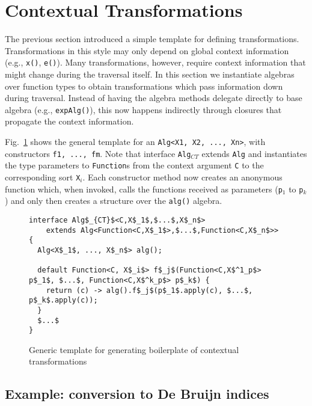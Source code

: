 \section{Contextual Transformations}\label{sec:contexttrans}

The previous section introduced a simple template for defining
transformations. Transformations in this style may only depend on
global context information (e.g., \lstinline{x()}, \lstinline{e()}).
Many transformations, however, require context information that might
change during the traversal itself. In this section we instantiate
algebras over function types to obtain transformations which pass
information down during traversal. Instead of having the algebra
methods delegate directly to base algebra (e.g.,
\lstinline{expAlg()}), this now happens indirectly through closures
that propagate the context information.

Fig.~\ref{ctxTrafoTemplate} shows the general template for an \lstinline{Alg<X1, X2, ..., Xn>}, with constructors \lstinline{f1, ..., fm}.
Note that interface \lstinline{Alg}$_{CT}$ extends \lstinline{Alg} and instantiates the type parameters to \lstinline{Function}s from the context argument \lstinline{C} to the corresponding sort \lstinline{X}$_i$.
Each constructor method now creates an anonymous function which, when invoked, calls the functions received as parameters (\lstinline{p}$_1$ to \lstinline{p}$_k$) and only then creates a structure over the \lstinline{alg()} algebra.

\begin{figure}[t]
\nocaptionrule
\begin{lstlisting}[mathescape=true]
interface Alg$_{CT}$<C,X$_1$,$...$,X$_n$>
    extends Alg<Function<C,X$_1$>,$...$,Function<C,X$_n$>> {
  Alg<X$_1$, ..., X$_n$> alg();

  default Function<C, X$_i$> f$_j$(Function<C,X$^1_p$> p$_1$, $...$, Function<C,X$^k_p$> p$_k$) {
    return (c) -> alg().f$_j$(p$_1$.apply(c), $...$, p$_k$.apply(c));
  }
  $...$
}
\end{lstlisting}
\caption{Generic template for generating boilerplate of contextual transformations}
\label{ctxTrafoTemplate}
\end{figure}

\subsection{Example: conversion to De Bruijn indices}\label{subsec:debruign_example}

